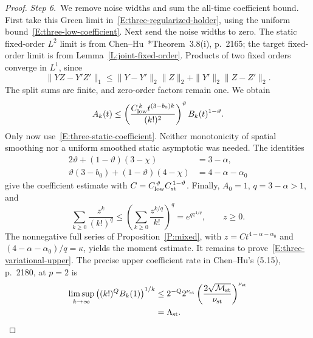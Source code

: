 \documentclass[12pt,oneside,openany]{book}
\numberwithin{equation}{section}
\theoremstyle{nogostyle}
\theoremstyle{definition}
\begin{document}
\begin{proof}
  \medskip
  \noindent\textit{Step 6.~}We remove noise widths and sum the all-time
  coefficient bound.
  First take this Green limit in~\eqref{E:three-regularized-holder}, using the
  uniform bound~\eqref{E:three-low-coefficient}. Next send the noise widths to
  zero. The static fixed-order $L^2$ limit is from
  Chen--Hu~\cite{chen.hu:25:hyperbolic}*{Theorem~3.8(i), p.~2165}; the target
  fixed-order limit is from Lemma~\ref{L:joint-fixed-order}. Products of two
  fixed orders converge in $L^1$, since
  \[
    \|YZ-Y'Z'\|_1
    \le\|Y-Y'\|_2\|Z\|_2+\|Y'\|_2\|Z-Z'\|_2.
  \]
  The split sums are finite, and zero-order factors remain one. We obtain
  \[
    A_k(t)\le
    \left(\frac{C_{\rm low}^{\,k}t^{(3-b_0)k}}{(k!)^2}\right)^\vartheta
    B_k(t)^{1-\vartheta}.
  \]
  Only now use~\eqref{E:three-static-coefficient}. Neither monotonicity of
  spatial smoothing nor a uniform smoothed static asymptotic was needed. The
  identities
  \[
    \begin{split}
      2\vartheta+(1-\vartheta)(3-\chi)&=3-\alpha,\\
      \vartheta(3-b_0)+(1-\vartheta)(4-\chi)&=4-\alpha-\alpha_0
    \end{split}
  \]
  give the coefficient estimate with $C = C_{\rm low}^{\,\vartheta}C_{\rm
  st}^{\,1-\vartheta}$. Finally, $A_0 = 1$, $q = 3-\alpha > 1$, and
  \[
    \sum_{k\ge0}\frac{z^k}{(k!)^q}
    \le\left(\sum_{k\ge0}\frac{z^{k/q}}{k!}\right)^q
    =e^{qz^{1/q}},\qquad z\ge0.
  \]
  The nonnegative full series of Proposition~\ref{P:mixed}, with $z =
  Ct^{4-\alpha-\alpha_0}$ and $(4-\alpha-\alpha_0)/q = \kappa$, yields the
  moment estimate. It remains to prove~\eqref{E:three-variational-upper}. The
  precise upper coefficient rate in Chen--Hu's (5.15), p.~2180, at $p = 2$ is
  \[
    \begin{split}
      \limsup_{k\to\infty}
      \left((k!)^Q B_k(1)\right)^{1/k}
      &\le 2^{-Q}2^{\nu_{\rm st}}
      \left(\frac{2\sqrt{\mathcal{M}_{\rm st}}}{\nu_{\rm st}}\right)^{\nu_{\rm st}}\\
      &=\Lambda_{\rm st}.
    \end{split}
  \]


\end{proof}
\end{document}
